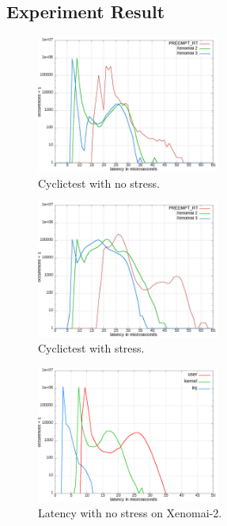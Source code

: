 \documentclass[10pt,a4paper]{article}
\begin{document}
\begin{multicols}{2}
\subsection{Experiment Result}
\begin{figure}[H]
\begin{center}
\includegraphics[width=6cm]{img/cyclictest_idle.jpg}
\caption{Cyclictest with no stress.}
\label{cyclictest-idle}
\end{center}
\end{figure}
\begin{figure}[H]
\begin{center}
\includegraphics[width=6cm]{img/cyclictest_stress.jpg}
\caption{Cyclictest with stress.}
\label{cyclictest-stress}
\end{center}
\end{figure}
\begin{figure}[H]
\begin{center}
\includegraphics[width=6cm]{img/x2-idle.png}
\caption{Latency with no stress on Xenomai-2.}
\label{x2-latency-idle}
\end{center}
\end{figure}

\end{multicols}
\end{document}
